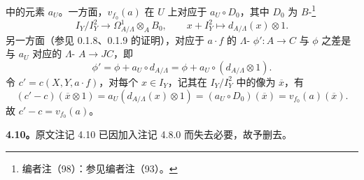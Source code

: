 中的元素 $a_U$。一方面，$v_{f_0}(a)$ 在 $U$ 上对应于 $a_U\circ D_0$，其中 $D_0$ 为 $B$-\footnote{编者注（98）：参见编者注（93）。}
\[I_Y/I_Y^2\longrightarrow\Omega^1_{A/\Lambda}\otimes_A B_0,\qquad x+I_Y^2\longmapsto d_{A/\Lambda}(x)\otimes1.\]
另一方面（参见 0.1.8、0.1.9 的证明），对应于 $a\cdot f$ 的 $\Lambda$- $\phi':A\to C$ 与 $\phi$ 之差是与 $a_U$ 对应的 $\Lambda$- $A\to JC$，即
\[\phi'=\phi+a_U\circ d_{A/\Lambda}=\phi+a_U\circ(d_{A/\Lambda}\otimes1).\]
令 $c'=c(X,Y,a\cdot f)$，对每个 $x\in I_Y$，记其在 $I_Y/I_Y^2$ 中的像为 $\overline x$，有
\[(c'-c)(\overline x\otimes1)=a_U(d_{A/\Lambda}(x)\otimes1)=(a_U\circ D_0)(\overline x)=v_{f_0}(a)(\overline x).\]
故 $c'-c=v_{f_0}(a)$。

\textbf{4.10。}原文注记 4.10 已因加入注记 4.8.0 而失去必要，故予删去。

